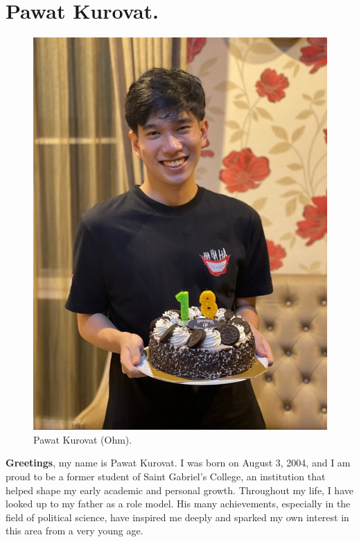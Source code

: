 \documentclass[11pt]{book}
\begin{document}
			\chapter{Pawat Kurovat.}
				\begin{figure}[H]
							\begin{center}
  							\includegraphics[scale=0.125]{Photos/Pawat_Kurovat.jpg}
  							\end{center}
 							\caption{Pawat Kurovat (Ohm).}
				\end{figure}

			\textbf{Greetings}, my name is Pawat Kurovat. I was born on August 3, 2004, and I am proud to be a former student of Saint Gabriel’s College, an institution that helped shape my early academic and personal growth. Throughout my life, I have looked up to my father as a role model. His many achievements, especially in the field of political science, have inspired me deeply and sparked my own interest in this area from a very young age.
\end{document}
